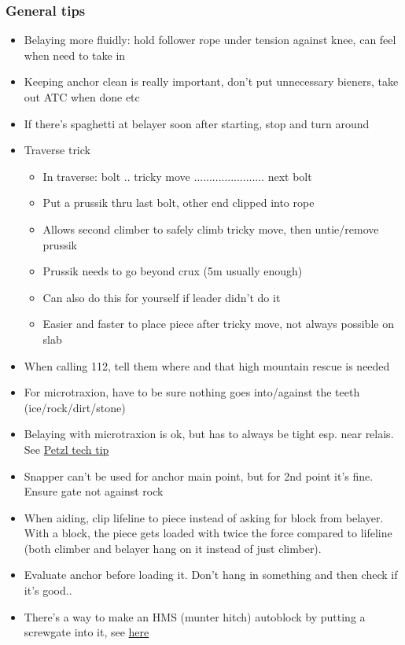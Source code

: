 \subsubsection{General tips}
\begin{itemize}
\item Belaying more fluidly: hold follower rope under tension against knee, can feel when need to take in
\item Keeping anchor clean is really important, don't put unnecessary bieners, take out ATC when done etc
\item If there's spaghetti at belayer soon after starting, stop and turn around
\item Traverse trick
	\begin{itemize}
	\item In traverse: bolt .. tricky move ....................... next bolt
	\item Put a prussik thru last bolt, other end clipped into rope
	\item Allows second climber to safely climb tricky move, then untie/remove prussik
	\item Prussik needs to go beyond crux (5m usually enough)
	\item Can also do this for yourself if leader didn't do it
	\item Easier and faster to place piece after tricky move, not always possible on slab
	\end{itemize}
\item When calling 112, tell them where and that high mountain rescue is needed
\item For microtraxion, have to be sure nothing goes into/against the teeth (ice/rock/dirt/stone)
\item Belaying with microtraxion is ok, but has to always be tight esp. near relais. See \href{https://www.petzl.com/US/en/Sport/Belaying-the-second-with-a-MICRO-TRAXION--beware-of-any-fall?ProductName=MICRO-TRAXION}{Petzl tech tip}
\item Snapper can't be used for anchor main point, but for 2nd point it's fine. Ensure gate not against rock
\item When aiding, clip lifeline to piece instead of asking for block from belayer. With a block, the piece gets loaded with twice the force compared to lifeline (both climber and belayer hang on it instead of just climber).
\item Evaluate anchor before loading it. Don't hang in something and then check if it's good..
\item There's a way to make an HMS (munter hitch) autoblock by putting a screwgate into it, see \href{https://www.alpinesavvy.com/blog/the-auto-locking-munter-hitch}{here}

\end{itemize}
